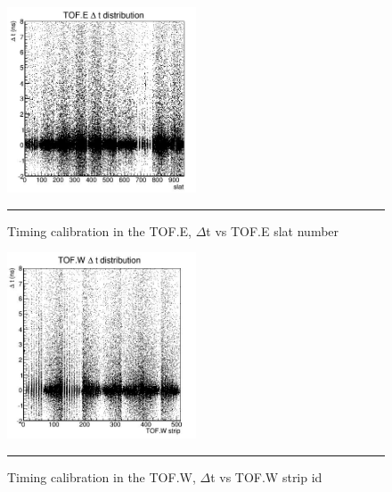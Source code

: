\begin{figure}[htbp]
  \centering
    \includegraphics[width=0.5\textwidth]{evtQA/ttofedist.JPG}
    \rule{35em}{0.5pt}
  \caption[Timing calibration in the TOF.E]{Timing calibration in the TOF.E, $\Delta$t vs TOF.E slat number}
  \label{fig:tofedist}
\end{figure}
\begin{figure}[htbp]
  \centering
    \includegraphics[width=0.5\textwidth]{evtQA/ttofwdist.JPG}
    \rule{35em}{0.5pt}
  \caption[Timing calibration in the TOF.W]{Timing calibration in the TOF.W, $\Delta$t vs TOF.W strip id}
  \label{fig:tofwdist}
\end{figure}

\pagebreak
\pagebreak
